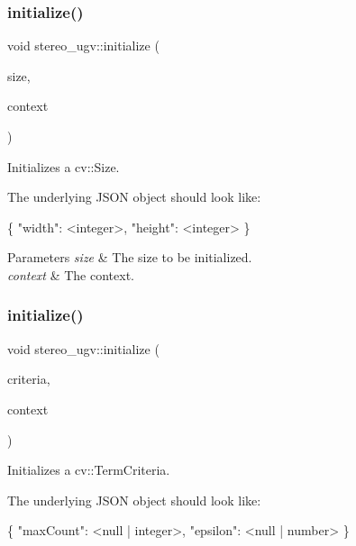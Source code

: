 \subsubsection{\texorpdfstring{initialize()}{initialize()}\hspace{0.1cm}{\footnotesize\ttfamily [4/8]}}
{\footnotesize\ttfamily void stereo\+\_\+ugv\+::initialize (\begin{DoxyParamCaption}\item[{cv\+::\+Size $\ast$}]{size,  }\item[{const \hyperlink{classstereo__ugv_1_1Context}{Context} \&}]{context }\end{DoxyParamCaption})}



Initializes a cv\+::\+Size. 

The underlying J\+S\+ON object should look like\+: 
\begin{DoxyCode}
\{
  \textcolor{stringliteral}{"width"}: <integer>,
  \textcolor{stringliteral}{"height"}: <integer>
\}
\end{DoxyCode}
 
\begin{DoxyParams}{Parameters}
{\em size} & The size to be initialized. \\
\hline
{\em context} & The context. \\
\hline
\end{DoxyParams}
\mbox{\label{namespacestereo__ugv_a0a98148c84d1f085ac51c2f2fb7c8e7a}} 
\subsubsection{\texorpdfstring{initialize()}{initialize()}\hspace{0.1cm}{\footnotesize\ttfamily [5/8]}}
{\footnotesize\ttfamily void stereo\+\_\+ugv\+::initialize (\begin{DoxyParamCaption}\item[{cv\+::\+Term\+Criteria $\ast$}]{criteria,  }\item[{const \hyperlink{classstereo__ugv_1_1Context}{Context} \&}]{context }\end{DoxyParamCaption})}



Initializes a cv\+::\+Term\+Criteria. 

The underlying J\+S\+ON object should look like\+: 
\begin{DoxyCode}
\{
  \textcolor{stringliteral}{"maxCount"}: <null | integer>,
  \textcolor{stringliteral}{"epsilon"}: <null | number>
\}
\end{DoxyCode}
 
